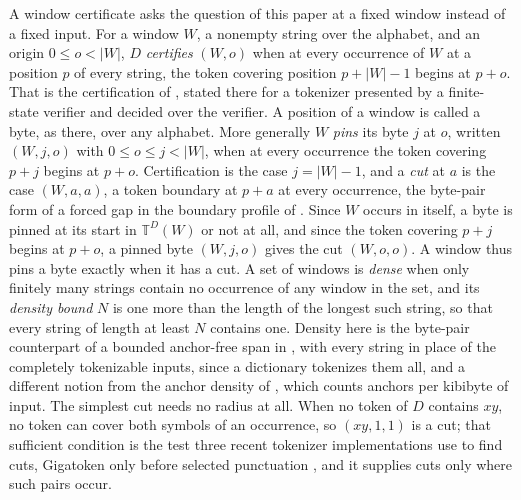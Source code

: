\documentclass[11pt,a4paper]{article}
\theoremstyle{definition}
\theoremstyle{plain}
\newcommand{\T}{\mathbb{T}}
\begin{document}
A window certificate asks the question of this paper at a fixed window instead of a fixed input. For a window \(W\), a
nonempty string over the alphabet, and an origin \(0 \le o < |W|\), \(D\) \emph{certifies} \((W, o)\) when at every
occurrence of \(W\) at a position \(p\) of every string, the token covering position \(p + |W| - 1\) begins at
\(p + o\). That is the certification of \citet[Definition~2]{nidhogg2026finitelyverifiable}, stated there for a
tokenizer presented by a finite-state verifier and decided over the verifier. A position of a window is called a byte,
as there, over any alphabet. More generally \(W\) \emph{pins} its byte \(j\) at \(o\), written \((W, j, o)\) with
\(0 \le o \le j < |W|\), when at every occurrence the token covering \(p + j\) begins at \(p + o\). Certification is the
case \(j = |W| - 1\), and a \emph{cut} at \(a\) is the case \((W, a, a)\), a token boundary at \(p + a\) at every
occurrence, the byte-pair form of a forced gap in the boundary profile of \citet{nidhogg2026splitwindows}. Since \(W\)
occurs in itself, a byte is pinned at its start in \(\T^D(W)\) or not at all, and since the token covering \(p + j\)
begins at \(p + o\), a pinned byte \((W, j, o)\) gives the cut \((W, o, o)\). A window thus pins a byte exactly when it
has a cut. A set of windows is \emph{dense} when only finitely many strings contain no occurrence of any window in the
set, and its \emph{density bound} \(N\) is one more than the length of the longest such string, so that every string of
length at least \(N\) contains one. Density here is the byte-pair counterpart of a bounded anchor-free span in
\citet{nidhogg2026splitting}, with every string in place of the completely tokenizable inputs, since a dictionary
tokenizes them all, and a different notion from the anchor density of \citet{nidhogg2026splitwindows}, which counts
anchors per kibibyte of input. The simplest cut needs no radius at all. When no token of \(D\) contains \(xy\), no token
can cover both symbols of an occurrence, so \((xy, 1, 1)\) is a cut; that sufficient condition is the test three recent
tokenizer implementations use to find cuts, Gigatoken only before selected punctuation
\citep{rod2026gigatoken, sentencepiecelite2026, xu2026parallel}, and it supplies cuts only where such pairs occur.

\end{document}
